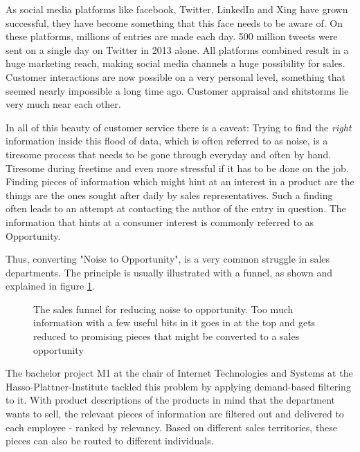 As social media platforms like facebook, Twitter, LinkedIn and Xing
have grown successful, they have become something that this face needs to be aware of.
On these platforms, millions of entries are made each day.
500 million tweets were sent on a single day on Twitter in 2013 alone.
All platforms combined result in a huge marketing reach,
making social media channels a huge possibility for sales.
Customer interactions are now possible on a very personal level,
something that seemed nearly impossible a long time ago.
Customer appraisal and shitstorms lie very much near each other.
\newline

In all of this beauty of customer service there is a caveat:
Trying to find the \textit{right} information inside this
flood of data, which is often referred to as noise, is a tiresome
process that needs to be gone through everyday and often by hand.
Tiresome during freetime and even more stressful if it has to be done on the job.
Finding pieces of information which might hint at an interest
in a product are the things are the ones sought after daily by sales representatives.
Such a finding often leads to an attempt at contacting the author of the
entry in question. The information that hints at a consumer interest is commonly
referred to as Opportunity.

Thus, converting "Noise to Opportunity", is a very common struggle
in sales departments. The principle is usually illustrated with a funnel,
as shown and explained in figure \ref{fig:sales-funnel}.


\begin{figure}[bth]
    \caption{The sales funnel for reducing noise to opportunity. Too much
    information with a few useful bits in it goes in at the top and gets
    reduced to promising pieces that might be converted to a sales opportunity}
    \label{fig:sales-funnel}
\end{figure}

The bachelor project M1 at the chair of Internet Technologies and Systems
at the Hasso-Plattner-Institute tackled this problem by applying demand-based filtering to it.
With product descriptions of the products in mind that the department wants to sell,
the relevant pieces of information are filtered out and delivered to each employee -
ranked by relevancy. Based on different sales territories,
these pieces can also be routed to different individuals.
\newline


